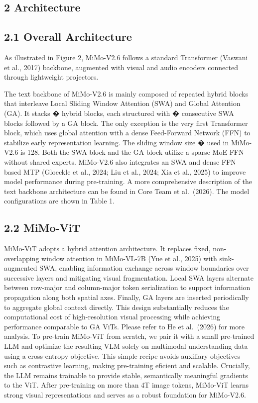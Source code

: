 \documentclass[
  10
]{article}
\begin{document}
\subsection{2 Architecture}\label{architecture}

\subsection{2.1 Overall Architecture}\label{overall-architecture}

As illustrated in Figure 2, MiMo-V2.6 follows a standard Transformer
(Vaswani et al., 2017) backbone, augmented with visual and audio
encoders connected through lightweight projectors.

The text backbone of MiMo-V2.6 is mainly composed of repeated hybrid
blocks that interleave Local Sliding Window Attention (SWA) and Global
Attention (GA). It stacks � hybrid blocks, each structured with �
consecutive SWA blocks followed by a GA block. The only exception is the
very first Transformer block, which uses global attention with a dense
Feed-Forward Network (FFN) to stabilize early representation learning.
The sliding window size � used in MiMo-V2.6 is 128. Both the SWA block
and the GA block utilize a sparse MoE FFN without shared experts.
MiMo-V2.6 also integrates an SWA and dense FFN based MTP (Gloeckle et
al., 2024; Liu et al., 2024; Xia et al., 2025) to improve model
performance during pre-training. A more comprehensive description of the
text backbone architecture can be found in Core Team et al.~(2026). The
model configurations are shown in Table 1.

\subsection{2.2 MiMo-ViT}\label{mimo-vit}

MiMo-ViT adopts a hybrid attention architecture. It replaces fixed,
non-overlapping window attention in MiMo-VL-7B (Yue et al., 2025) with
sink-augmented SWA, enabling information exchange across window
boundaries over successive layers and mitigating visual fragmentation.
Local SWA layers alternate between row-major and column-major token
serialization to support information propagation along both spatial
axes. Finally, GA layers are inserted periodically to aggregate global
context directly. This design substantially reduces the computational
cost of high-resolution visual processing while achieving performance
comparable to GA ViTs. Please refer to He et al.~(2026) for more
analysis. To pre-train MiMo-ViT from scratch, we pair it with a small
pre-trained LLM and optimize the resulting VLM solely on multimodal
understanding data using a cross-entropy objective. This simple recipe
avoids auxiliary objectives such as contrastive learning, making
pre-training eficient and scalable. Crucially, the LLM remains trainable
to provide stable, semantically meaningful gradients to the ViT. After
pre-training on more than 4T image tokens, MiMo-ViT learns strong visual
representations and serves as a robust foundation for MiMo-V2.6.
\end{document}
